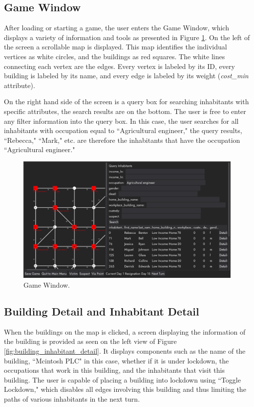 \documentclass{article}
\begin{document}
\subsection{Game Window}
After loading or starting a game, the user enters the Game Window, which displays a variety of information and tools as presented in Figure \ref{fig:game_window}. On the left of the screen a scrollable map is displayed. This map identifies the individual vertices as white circles, and the buildings as red squares. The white lines connecting each vertex are the edges. Every vertex is labeled by its ID, every building is labeled by its name, and every edge is labeled by its weight (\textit{cost\_min} attribute).

On the right hand side of the screen is a query box for searching inhabitants with specific attributes, the search results are on the bottom. The user is free to enter any filter information into the query box. In this case, the user searches for all inhabitants with occupation equal to ``Agricultural engineer," the query results, ``Rebecca," ``Mark," etc. are therefore the inhabitants that have the occupation ``Agricultural engineer."

\begin{figure}[H]
  \centering
  \includegraphics[width=1\textwidth]{game_window.png}
  \caption{Game Window.}
  \label{fig:game_window}
\end{figure}

\subsection{Building Detail and Inhabitant Detail}
When the buildings on the map is clicked, a screen displaying the information of the building is provided as seen on the left view of Figure \ref{fig:building_inhabitant_detail}. It displays components such as the name of the building, ``Mcintosh PLC" in this case, whether if it is under lockdown, the occupations that work in this building, and the inhabitants that visit this building. The user is capable of placing a building into lockdown using ``Toggle Lockdown," which disables all edges involving this building and thus limiting the paths of various inhabitants in the next turn.
\end{document}
